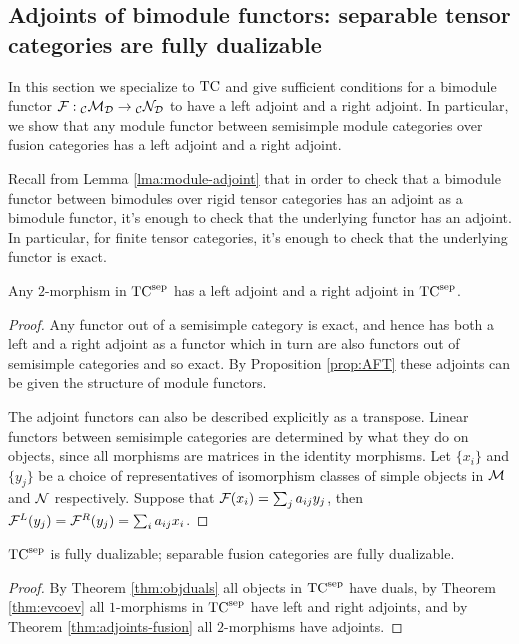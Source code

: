 \documentclass{amsart}
\begin{document}
\subsection{Adjoints of bimodule functors: separable tensor categories are fully dualizable} \label{sec:df-functors}

In this section we specialize to $\mathrm{TC}$ and give sufficient conditions for a bimodule functor $\mathcal F: {}_\mathcal C \mathcal M_\mathcal D \rightarrow {}_\mathcal C \mathcal N_\mathcal D$ to have a left adjoint and a right adjoint.  In particular, we show that any module functor between semisimple module categories over fusion categories has a left adjoint and a right adjoint. 

Recall from Lemma \ref{lma:module-adjoint} that in order to check that a bimodule functor between bimodules over rigid tensor categories has an adjoint as a bimodule functor, it's enough to check that the underlying functor has an adjoint.  In particular, for finite tensor categories, it's enough to check that the underlying functor is exact.

\begin{theorem} \label{thm:adjoints-fusion}
Any $2$-morphism in ${\mathrm{TC}^{\text{sep}}}$ has a left adjoint and a right adjoint in ${\mathrm{TC}^{\text{sep}}}$.
\end{theorem}
\begin{proof}
Any functor out of a semisimple category is exact, and hence has both a left and a right adjoint as a functor which in turn are also functors out of semisimple categories and so exact.  By Proposition \ref{prop:AFT} these adjoints can be given the structure of module functors.

The adjoint functors can also be described explicitly as a transpose.  Linear functors between semisimple categories are determined by what they do on objects, since all morphisms are matrices in the identity morphisms.  Let $\{x_i\}$ and $\{y_j\}$ be a choice of representatives of isomorphism classes of simple objects in $\mathcal M$ and $\mathcal N$ respectively.  Suppose that $\mathcal F(x_i) = \sum_j a_{ij} y_j$, then $\mathcal F^L(y_j) = \mathcal F^R(y_j) = \sum_i a_{ij} x_i$. 
\end{proof}

\begin{maintheorem}  \label{thm:TC-dualizable}
 ${\mathrm{TC}^{\text{sep}}}$ is fully dualizable; separable fusion categories are fully dualizable.
\end{maintheorem}
\begin{proof}
By Theorem \ref{thm:objduals} all objects in ${\mathrm{TC}^{\text{sep}}}$ have duals, by Theorem \ref{thm:evcoev} all $1$-morphisms in ${\mathrm{TC}^{\text{sep}}}$ have left and right adjoints, and by Theorem \ref{thm:adjoints-fusion} all $2$-morphisms have adjoints.
\end{proof}
\end{document}
